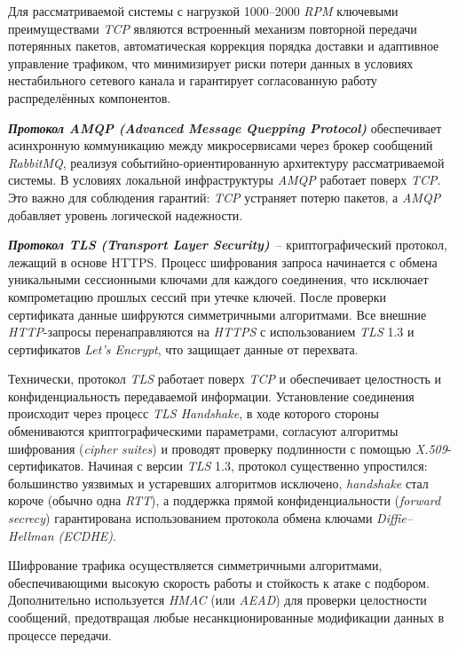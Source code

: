 Для рассматриваемой системы с нагрузкой 1000–2000 \textit{RPM} ключевыми преимуществами \textit{TCP} являются встроенный механизм повторной передачи потерянных пакетов, автоматическая коррекция порядка доставки и адаптивное управление трафиком, что минимизирует риски потери данных в условиях нестабильного сетевого канала и гарантирует согласованную работу распределённых компонентов.

\textit{\textbf{Протокол AMQP (Advanced Message Quepping Protocol)}} обеспечивает асинхронную коммуникацию между микросервисами через брокер сообщений \textit{RabbitMQ}, реализуя событийно-ориентированную архитектуру рассматриваемой системы. В условиях локальной инфраструктуры \textit{AMQP} работает поверх \textit{TCP}. Это важно для соблюдения гарантий: \textit{TCP} устраняет потерю пакетов, а \textit{AMQP} добавляет уровень логической надежности.

\textit{\textbf{Протокол TLS (Transport Layer Security)}}~-- криптографический протокол, лежащий в основе HTTPS. Процесс шифрования запроса начинается с обмена уникальными сессионными ключами для каждого соединения, что исключает компрометацию прошлых сессий при утечке ключей. После проверки сертификата данные шифруются симметричными алгоритмами. Все внешние \textit{HTTP}-запросы перенаправляются на \textit{HTTPS} с использованием \textit{TLS} 1.3 и сертификатов \textit{Let’s Encrypt}, что защищает данные от перехвата.

Технически, протокол \textit{TLS} работает поверх \textit{TCP} и обеспечивает целостность и конфиденциальность передаваемой информации. Установление соединения происходит через процесс \textit{TLS Handshake}, в ходе которого стороны обмениваются криптографическими параметрами, согласуют алгоритмы шифрования (\textit{cipher suites}) и проводят проверку подлинности с помощью \textit{X.509}-сертификатов. Начиная с версии \textit{TLS} 1.3, протокол существенно упростился: большинство уязвимых и устаревших алгоритмов исключено, \textit{handshake} стал короче (обычно одна \textit{RTT}), а поддержка прямой конфиденциальности (\textit{forward secrecy}) гарантирована использованием протокола обмена ключами \textit{Diffie–Hellman (ECDHE)}.

Шифрование трафика осуществляется симметричными алгоритмами, обеспечивающими высокую скорость работы и стойкость к атаке с подбором. Дополнительно используется \textit{HMAC} (или \textit{AEAD}) для проверки целостности сообщений, предотвращая любые несанкционированные модификации данных в процессе передачи.

